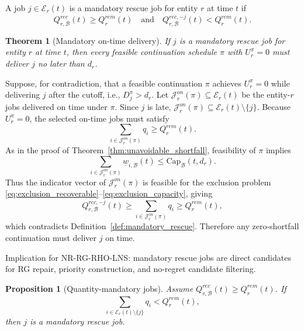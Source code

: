 \documentclass[a4paper,fleqn]{cas-sc}
\newtheorem{theorem}{Theorem}
\newtheorem{proposition}{Proposition}
\begin{document}
\begin{definition}
\label{def:mandatory_rescue}
A job \(j\in\mathcal E_r(t)\) is a mandatory rescue job for entity \(r\) at time \(t\) if
\begin{equation}
Q_{r,\mathcal B}^{rec}(t)\ge Q_r^{rem}(t)
\quad\text{and}\quad
Q_{r,\mathcal B}^{rec,-j}(t)<Q_r^{rem}(t).
\label{eq:mandatory_definition}
\end{equation}
\end{definition}

\begin{theorem}[Mandatory on-time delivery]
\label{thm:mandatory_delivery}
If \(j\) is a mandatory rescue job for entity \(r\) at time \(t\), then every feasible continuation schedule \(\pi\) with \(U_r^\pi=0\) must deliver \(j\) no later than \(d_r\).
\end{theorem}

\begin{pf}
Suppose, for contradiction, that a feasible continuation \(\pi\) achieves \(U_r^\pi=0\) while delivering \(j\) after the cutoff, i.e., \(D_j^\pi>d_r\). Let \(\mathcal J_r^{on}(\pi)\subseteq\mathcal E_r(t)\) be the entity-\(r\) jobs delivered on time under \(\pi\). Since \(j\) is late, \(\mathcal J_r^{on}(\pi)\subseteq\mathcal E_r(t)\setminus\{j\}\). Because \(U_r^\pi=0\), the selected on-time jobs must satisfy
\[
\sum_{i\in\mathcal J_r^{on}(\pi)}q_i
\ge
Q_r^{rem}(t).
\]
As in the proof of Theorem~\ref{thm:unavoidable_shortfall}, feasibility of \(\pi\) implies
\[
\sum_{i\in\mathcal J_r^{on}(\pi)}
\underline w_{i,\mathcal B}(t)
\le
\mathrm{Cap}_{\mathcal B}(t,d_r).
\]
Thus the indicator vector of \(\mathcal J_r^{on}(\pi)\) is feasible for the exclusion problem \eqref{eq:exclusion_recoverable}--\eqref{eq:exclusion_capacity}, giving
\[
Q_{r,\mathcal B}^{rec,-j}(t)
\ge
\sum_{i\in\mathcal J_r^{on}(\pi)}q_i
\ge
Q_r^{rem}(t),
\]
which contradicts Definition~\ref{def:mandatory_rescue}. Therefore any zero-shortfall continuation must deliver \(j\) on time.
\end{pf}

Implication for NR-RG-RHO-LNS: mandatory rescue jobs are direct candidates for RG repair, priority construction, and no-regret candidate filtering.

\begin{proposition}[Quantity-mandatory jobs]
\label{prop:quantity_mandatory}
Assume \(Q_{r,\mathcal B}^{rec}(t)\ge Q_r^{rem}(t)\). If
\begin{equation}
\sum_{i\in\mathcal E_r(t)\setminus\{j\}}q_i
<
Q_r^{rem}(t),
\label{eq:quantity_mandatory_cond}
\end{equation}
then \(j\) is a mandatory rescue job.
\end{proposition}
\end{document}
